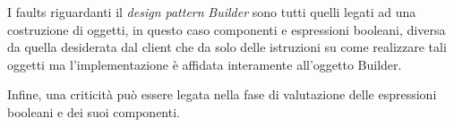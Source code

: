 I faults riguardanti il \emph{design pattern} \emph{Builder} sono tutti quelli legati ad una costruzione di oggetti, in questo caso componenti e espressioni booleani, diversa da quella desiderata dal client che da solo delle istruzioni su come realizzare tali oggetti ma l'implementazione è affidata interamente all'oggetto Builder.

Infine, una criticità può essere legata nella fase di valutazione delle espressioni booleani e dei suoi componenti.